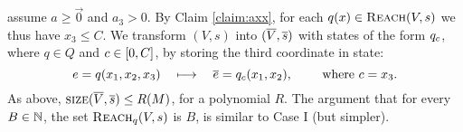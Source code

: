 \begin{appendixproof}
\Wlog assume $a\geq \vec 0$ and $a_3 > 0$.
By Claim \ref{claim:axx}, for each $q(x) \in \textsc{Reach}(V,s)$
we thus have $x_3 \leq C$.
%
We transform $(V,s)$ into $(\overline{V}, \overline{s})$ 
with states of the form $q_{c}$, where $q\in Q$ and $c\in[0, C]$, 
by storing the third coordinate in state:
\[
e = q(x_1, x_2, x_3) \quad \longmapsto \quad
\overline{e} = q_{c}(x_1, x_2), 
\qquad
\text{ where } c = x_3.
\]
As above, $\textsc{size}(\overline{V}, \overline{s}) \leq R(M)$, for a polynomial $R$.
The argument  that for every $B\in\mathbb{N}$,
the set $\textsc{Reach}_{q}(V,s)$ is  {$B$}, is similar to Case I (but simpler).
\end{appendixproof}

%
%
